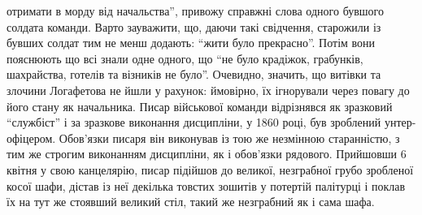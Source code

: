 \documentclass[a4paper,20pt]{report}
\begin{document}
отримати в морду від начальства'', привожу справжні слова одного бувшого
солдата команди. Варто зауважити, що, даючи такі свідчення, старожили із бувших
солдат тим не менш додають: ``жити було прекрасно''. Потім вони пояснюють що
всі знали одне одного, що ``не було крадіжок, грабунків, шахрайства, готелів та
візників не було''. Очевидно, значить, що витівки та злочини Логафетова не йшли
у рахунок: ймовірно, їх ігнорували через повагу до його стану як начальника.
Писар військової команди відрізнявся як зразковий ``службіст'' і за зразкове
виконання дисципліни, у 1860 році, був зроблений унтер-офіцером. Обов'язки
писаря він виконував із тою же незмінною старанністю, з тим же строгим
виконанням дисципліни, як і обов'язки рядового.
Прийшовши 6 квітня у свою канцелярію, писар підійшов до великої, незграбної грубо зробленої косої шафи,
дістав із неї декілька товстих зошитів у потертій палітурці і поклав їх на тут же стоявший великий стіл, такий же 
незграбний як і сама шафа.
\end{document}
